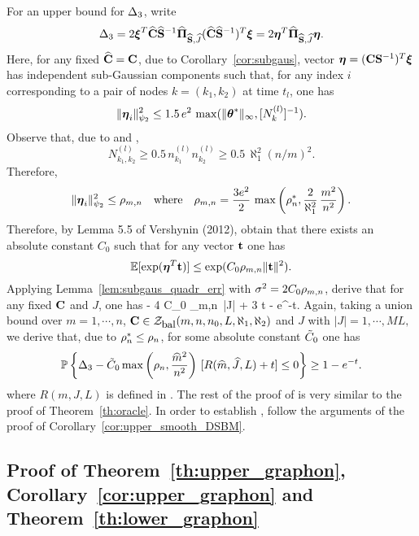 %
%  
For an upper bound for $\Delta_3$,  write   
$$
\Del_3   = 2  \bxi^T \hbC \hbS^{-1} \hPShJ (\hbC \hbS^{-1})^T \bxi    = 2  \boeta^T   \hPShJ    \boeta.
$$
Here, for any fixed $\widehat{\mathbf{C}} = \mathbf{C}$, due to Corollary~\ref{cor:subgaus}, vector $\boeta = (\bC \bS^{-1})^T \bxi$
has independent sub-Gaussian components such that,  for any index $i$ corresponding to a pair of nodes 
$k = (k_1, k_2)$ at time $t_l$,  one has 
$$
\| \boeta_{i} \|_{\psi_2}^2 \leq   1.5\, e^2  \, \max( \|\btes\|_{\infty}, [N^{(l)}_{k}]^{-1}).
$$
Observe that, due to  and ,    
$$
N^{(l)}_{{k_1},{k_2}} \geq  0.5\, n^{(l)}_{k_1} n^{(l)}_{k_2} \geq 0.5\, \aleph_1^2 (n/m)^2.
$$
Therefore, 
$$
\| \boeta_{i} \|_{\psi_2}^2 \leq  \rho_{m,n} \quad \mbox{where} \quad  \rho_{m,n}= 
\frac{3e^2}{2} \, \max \lkr \rhons,  \frac{2}{\aleph_1^2}\, \frac{m^2}{n^2}\rkr.
$$   
Therefore, by Lemma 5.5 of Vershynin (2012), obtain that there exists an absolute constant $C_0$ such that 
for any vector  $\mathbf{t}$  one has 
$$
\EE [\exp(\boeta^T \bt)] \leq \exp(C_0 \rho_{m,n} \|\bt\|^2). 
$$
Applying Lemma~\ref{lem:subgaus_quadr_err} with $\sigma^2 = 2 C_0 \rho_{m,n}$, derive that for any fixed 
$\mathbf{C}$ and $J$, one has
\bes  
\PP {} \boeta  \PSJ \boeta   -  4 C_0 \rho_{m,n}\,  |J| +   3 t \rkr {} \rfi {}- e^{-t}.
\ees
Again, taking a union bound over $m=1, \cdots, n$, $\mathbf{C} \in {\cal{Z}}_{\mbox{\small bal}} (m,n,n_0,L,\aleph_1,\aleph_2)$ 
and $J$ with $|J| = 1, \cdots, ML,$ we derive that, due to $\rho_n^{*} \leq \rho_n$, for some absolute constant $\tilde{C}_0$  one has
\begin{align}  \label{new_Del3er}
\PP \lfi \Del_3 - \tCo \max \lkr \rho_n, \frac{\hm^2}{n^2} \rkr\,  [R(\hm,\hJ,L) + t] \leq 0 \rfi 
\geq  1- e^{-t}. 
\end{align}
where $R(m,J,L)$ is defined in .
The rest of the proof  of  is very similar to the proof of Theorem~\ref{th:oracle}.
In order to establish , follow the arguments of the proof of Corollary~\ref{cor:upper_smooth_DSBM}.
 




 


\subsection{ Proof  of Theorem~\ref{th:upper_graphon}, Corollary~\ref{cor:upper_graphon} and 
Theorem~\ref{th:lower_graphon} }


